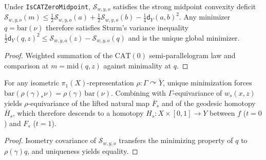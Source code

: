 \begin{theorem}
\label{thm_sturm_cat0_variance}
\leanok
{}
Under \texttt{IsCATZeroMidpoint}, $\mathcal{S}_{w, y, o}$ satisfies the strong midpoint convexity deficit $\mathcal{S}_{w, y, o}(m) \le \frac{1}{2}\mathcal{S}_{w, y, o}(a) + \frac{1}{2}\mathcal{S}_{w, y, o}(b) - \frac{1}{4}\mathsf{d}_Y(a, b)^2$. Any minimizer $q = \mathrm{bar}(\nu)$ therefore satisfies Sturm's variance inequality $\frac{1}{2}\mathsf{d}_Y(q, z)^2 \le \mathcal{S}_{w, y, o}(z) - \mathcal{S}_{w, y, o}(q)$ and is the unique global minimizer.
\end{theorem}
\begin{proof}\leanok Weighted summation of the $\mathrm{CAT}(0)$ semi-parallelogram law and comparison at $m = \mathrm{mid}(q, z)$ against minimality at $q$.\end{proof}

\begin{theorem}
\label{thm_sturm_equivariant_natural_map}
\leanok
{}
For any isometric $\pi_1(X)$-representation $\rho : \Gamma \curvearrowright \widetilde{Y}$, unique minimization forces $\mathrm{bar}(\rho(\gamma)_* \nu) = \rho(\gamma)\,\mathrm{bar}(\nu)$. Combining with $\Gamma$-equivariance of $w_s(x, z)$ yields $\rho$-equivariance of the lifted natural map $\overline{F}_s$ and of the geodesic homotopy $\overline{H}_s$, which therefore descends to a homotopy $H_s : X \times [0, 1] \to Y$ between $f$ ($t = 0$) and $F_s$ ($t = 1$).
\end{theorem}
\begin{proof}\leanok Isometry covariance of $\mathcal{S}_{w, y, o}$ transfers the minimizing property of $q$ to $\rho(\gamma) q$, and uniqueness yields equality.\end{proof}

